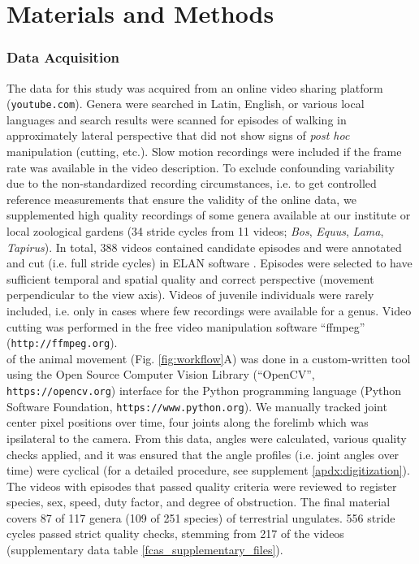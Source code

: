 \FloatBarrier\clearpage
\section{Materials and Methods}
\subsubsection{Data Acquisition}
The data for this study was acquired from an online video sharing platform (\nolinkurl{youtube.com}).
Genera were searched in Latin, English, or various local languages and search results were scanned for episodes of walking in approximately lateral perspective that did not show signs of \textit{post hoc} manipulation (cutting, etc.).
Slow motion recordings were included if the frame rate was available in the video description.
To exclude confounding variability due to the non-standardized recording circumstances, i.e. to get controlled reference measurements that ensure the validity of the online data, we supplemented high quality recordings of some genera available at our institute or local zoological gardens (34 stride cycles from 11 videos; \textit{Bos}, \textit{Equus}, \textit{Lama}, \textit{Tapirus}).
In total, 388 videos contained candidate episodes and were annotated and cut (i.e. full stride cycles) in ELAN software \citep[Max Planck Institute for Psycholinguistics, Nijmegen;][]{Brugman2004}.
Episodes were selected to have sufficient temporal and spatial quality and correct perspective (movement perpendicular to the view axis).
Videos of juvenile individuals were rarely included, i.e. only in cases where few recordings were available for a genus.
Video cutting was performed in the free video manipulation software ``ffmpeg'' (\nolinkurl{http://ffmpeg.org}).
\\ of the animal movement (Fig. \ref{fig:workflow}A) was done in a custom-written tool using the Open Source Computer Vision Library (``OpenCV'', \nolinkurl{https://opencv.org}) interface for the Python programming language (Python Software Foundation, \nolinkurl{https://www.python.org}).
We manually tracked joint center pixel positions over time,  four joints along the forelimb which was ipsilateral to the camera.
From this data,  angles were calculated, various quality checks applied, and it was ensured that the  angle profiles (i.e. joint angles over time) were cyclical (for a detailed procedure, see supplement \ref*{apdx:digitization}).
The videos with episodes that passed quality criteria were reviewed to register species, sex, speed, duty factor, and degree of obstruction.
The final material covers 87 of 117 genera (109 of 251 species) of terrestrial ungulates.
556 stride cycles passed strict quality checks, stemming from 217 of the videos (supplementary data table \ref{fcas_supplementary_files}).



